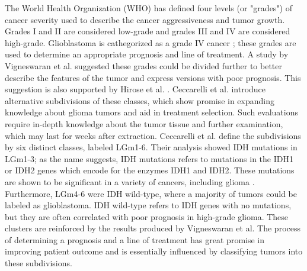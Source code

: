 The World Health Organization (WHO) has defined four levels (or "grades") of cancer severity used to describe the cancer aggressiveness and tumor growth. Grades I and II are considered low-grade and grades III and IV are considered high-grade. Glioblastoma is cathegorized as a grade IV cancer \cite{bleeker2012recent, gradesandpriorsubdivision}; these grades are used to determine an appropriate prognosis and line of treatment. A study by Vigneswaran et al. \cite{gradesandpriorsubdivision} suggested these grades could be divided further to better describe the features of the tumor and express versions with poor prognosis. This suggestion is also supported by Hirose et al. \cite{hirose2013subgrouping}. Ceccarelli et al. \cite{cellsubsets} introduce alternative subdivisions of these classes, which show promise in expanding knowledge about glioma tumors and aid in treatment selection. Such evaluations require in-depth knowledge about the tumor tissue and further examination, which may last for weeks after extraction. Ceccarelli et al. define the subdivisions by six distinct classes, labeled LGm1-6. Their analysis showed IDH mutations in LGm1-3; as the name suggests, IDH mutations refers to mutations in the IDH1 or IDH2 genes which encode for the enzymes IDH1 and IDH2. These mutations are shown to be significant in a variety of cancers, including glioma \cite{dang2016idh}. Furthermore, LGm4-6 were IDH wild-type, where a majority of tumors could be labeled as glioblastoma. IDH wild-type refers to IDH genes with no mutations, but they are often correlated with poor prognosis in high-grade glioma. These clusters are reinforced by the results produced by Vigneswaran et al. The process of determining a prognosis and a line of treatment has great promise in improving patient outcome and is essentially influenced by classifying tumors into these subdivisions.

